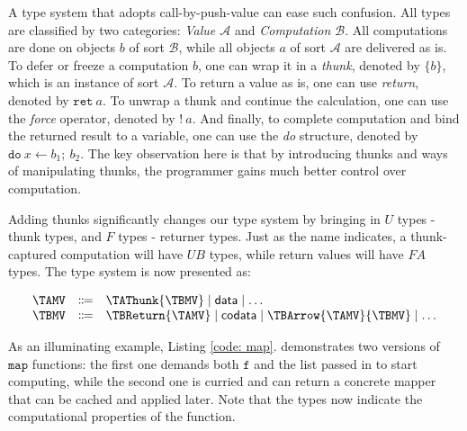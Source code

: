 \documentclass[acmsmall,nonacm]{acmart}
\begin{document}
\begin{listing}[ht]
    \begin{multicols}{3}
        \inputminted{Haskell}{examples/mappre1.zydeco}
        \vfill
        \inputminted{Haskell}{examples/mappre2.zydeco}
        \vfill
    \end{multicols}
    \begin{multicols}{2}
        \inputminted{Haskell}{examples/map1.zydeco}
        \vfill
        \inputminted{Haskell}{examples/map2.zydeco}
        \vfill
    \end{multicols}
    \label{code: map}
\end{listing}

A type system that adopts call-by-push-value can ease such confusion. All types are classified by two categories: \textit{Value $\mathcal{A}$} and \textit{Computation $\mathcal{B}$}. All computations are done on objects $b$ of sort $\mathcal{B}$, while all objects $a$ of sort $\mathcal{A}$ are delivered as is. To defer or freeze a computation $b$, one can wrap it in a \textit{thunk}, denoted by $\{ b \}$, which is an instance of sort $\mathcal{A}$. To return a value as is, one can use \textit{return}, denoted by $\texttt{ret}~a$. To unwrap a thunk and continue the calculation, one can use the \textit{force} operator, denoted by $!~a$. And finally, to complete computation and bind the returned result to a variable, one can use the \textit{do} structure, denoted by $\texttt{do}~x \leftarrow b_1;~b_2$. The key observation here is that by introducing thunks and ways of manipulating thunks, the programmer gains much better control over computation.

Adding thunks significantly changes our type system by bringing in $U$ types - thunk types, and $F$ types - returner types. Just as the name indicates, a thunk-captured computation will have $U B$ types, while return values will have $F A$ types. The type system is now presented as:

\[\begin{array}{rcl}
    \TAMV & \Coloneqq & \TAThunk{\TBMV} \mid \textsf{data} \mid \dots \\
    \TBMV & \Coloneqq & \TBReturn{\TAMV} \mid \textsf{codata} \mid \TBArrow{\TAMV}{\TBMV} \mid \dots \\
\end{array}\]

As an illuminating example, Listing \ref{code: map}. demonstrates two versions of $\texttt{map}$ functions: the first one demands both $\texttt{f}$ and the list passed in to start computing, while the second one is curried and can return a concrete mapper that can be cached and applied later. Note that the types now indicate the computational properties of the function.
\end{document}
